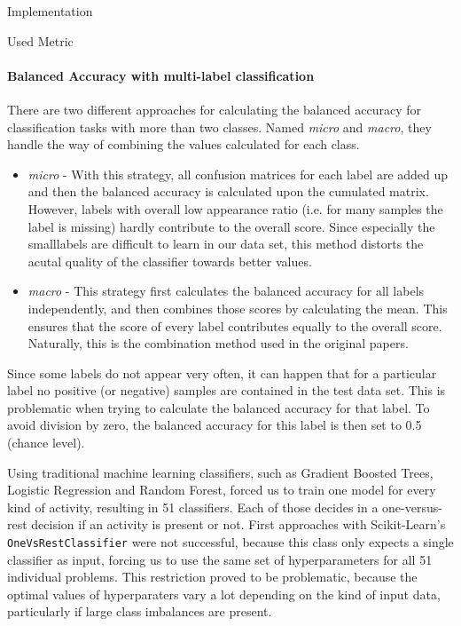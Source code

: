 \begin{section}{Implementation}
\begin{subsection}{Used Metric}
		\paragraph{Balanced Accuracy with multi-label classification}
		There are two different approaches for calculating the balanced accuracy for classification tasks with more than two classes. Named \emph{micro} and \emph{macro}, they handle the way of combining the values calculated for each class.
		\begin{itemize}
			\item \emph{micro} - With this strategy, all confusion matrices for each label are added up and then the balanced accuracy is calculated upon the cumulated matrix. However, labels with overall low appearance ratio (i.e. for many samples the label is missing) hardly contribute to the overall score. Since especially the \glqq small\grqq labels are difficult to learn in our data set, this method distorts the acutal quality of the classifier towards better values.
			\item \emph{macro} - This strategy first calculates the balanced accuracy for all labels independently, and then combines those scores by calculating the mean. This ensures that the score of every label contributes equally to the overall score. Naturally, this is the combination method used in the original papers.
		\end{itemize}
		Since some labels do not appear very often, it can happen that for a particular label no positive (or negative) samples are contained in the test data set. This is problematic when trying to calculate the balanced accuracy for that label. To avoid division by zero, the balanced accuracy for this label is then set to 0.5 (chance level).
		

	\end{subsection}

Using traditional machine learning classifiers, such as Gradient Boosted Trees, Logistic Regression and Random Forest, forced us to train one model for every kind of activity, resulting in 51 classifiers. Each of those decides in a one-versus-rest decision if an activity is present or not. 
First approaches with Scikit-Learn's \texttt{OneVsRestClassifier} were not successful, because this class only expects a single classifier as input, forcing us to use the same set of hyperparameters for all 51 individual problems. This restriction proved to be problematic, because the optimal values of hyperparaters vary a lot depending on the kind of input data, particularly if large class imbalances are present.


\end{section}
